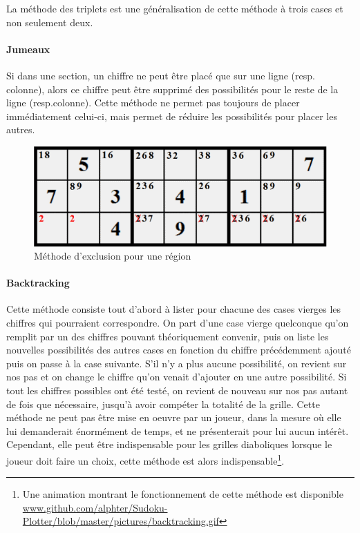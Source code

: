 \documentclass[12pt,a4paper]{report}
\begin{document}
La méthode des triplets est une généralisation de cette méthode à trois cases et non seulement deux.

\paragraph{Jumeaux} Si dans une section, un chiffre ne peut être placé que sur une ligne (resp. colonne), alors ce chiffre peut être supprimé des possibilités pour le reste de la ligne (resp.colonne). Cette méthode ne permet pas toujours de placer immédiatement celui-ci, mais permet de réduire les possibilités pour placer les autres.
\begin{figure}[!h]
 \center
 \includegraphics[scale=0.8]{../pictures/jumeaux}
 \caption{Méthode d'exclusion pour une région}
\end{figure}

\paragraph{Backtracking} Cette méthode consiste tout d'abord à lister pour chacune des cases vierges les chiffres qui pourraient correspondre. On part d'une case vierge quelconque qu'on remplit par un des chiffres pouvant théoriquement convenir, puis on liste les nouvelles possibilités des autres cases en fonction du chiffre précédemment ajouté puis on passe à la case suivante. S'il n'y a plus aucune possibilité, on revient sur nos pas et on change le chiffre qu'on venait d'ajouter en une autre possibilité. Si tout les chiffres possibles ont été testé, on revient de nouveau sur nos pas autant de fois que nécessaire, jusqu'à avoir compéter la totalité de la grille.
Cette méthode ne peut pas être mise en oeuvre par un joueur, dans la mesure où elle lui demanderait énormément de temps, et ne présenterait pour lui aucun intérêt. Cependant, elle peut être indispensable pour les grilles diaboliques lorsque le joueur doit faire un choix, cette méthode est alors indispensable\footnote{Une animation montrant le fonctionnement de cette méthode est disponible \url{www.github.com/alphter/Sudoku-Plotter/blob/master/pictures/backtracking.gif}}.
\end{document}
